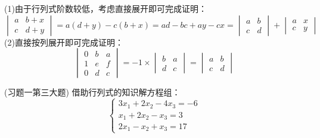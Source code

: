 \begin{solution}{}{}
    (1)由于行列式阶数较低，考虑直接展开即可完成证明：\[\begin{vmatrix}
        a&b+x\\
        c&d+y
    \end{vmatrix}=a(d+y)-c(b+x)=ad-bc+ay-cx=\begin{vmatrix}
        a&b\\
        c&d
    \end{vmatrix}+\begin{vmatrix}
        a&x\\
        c&y\end{vmatrix}\]
    (2)直接按列展开即可完成证明：\[\begin{vmatrix}
        0&b&a\\
        1&e&f\\
        0&d&c\end{vmatrix}=-1\times\begin{vmatrix}
        b&a\\
        d&c\end{vmatrix}=\begin{vmatrix}
            a&b\\
            c&d\end{vmatrix}\]
\end{solution}
\begin{example}{(习题一第三大题)}{}
    借助行列式的知识解方程组：\[
    \begin{cases}
        3x_1+2x_2-4x_3=-6\\
        x_1+2x_2-x_3=3\\
        2x_1-x_2+x_3=17\end{cases}\]
\end{example}
